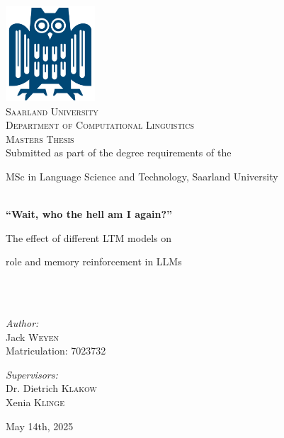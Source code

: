 \begin{titlepage}
\begin{center}

\includegraphics[width=0.25\textwidth]{images/uni-eule}~\\[1cm]

\textsc{\LARGE Saarland  University}\\[0.4cm]
\textsc{\Large Department of Computational Linguistics}\\[1.5cm]

\textsc{\Large Masters Thesis}\\[0.5cm]

Submitted as part of the degree requirements of the

MSc in Language Science and Technology, Saarland University \\[0.5cm]

\HRule \\[0.25cm]
{\LARGE \bfseries “Wait, who the hell am I again?”

The effect of different LTM models on

role and memory reinforcement in LLMs}\\[0.4cm]
\HRule \\[1.0cm]

\begin{minipage}{0.4\textwidth}
\begin{flushleft} \large
\emph{Author:}\\
Jack \textsc{Weyen}\\
Matriculation: 7023732
\end{flushleft}
\end{minipage}
\begin{minipage}{0.4\textwidth}
\begin{flushright} \large
\emph{Supervisors:} \\
Dr. Dietrich \textsc{Klakow}\\
Xenia \textsc{Klinge}\\
\end{flushright}
\end{minipage}

\vfill

{\large May 14th, 2025}

\end{center}
\end{titlepage}
